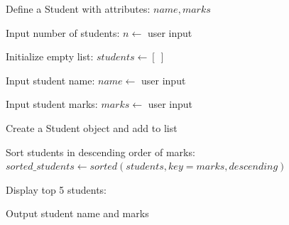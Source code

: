\begin{algorithm}
\caption{Display Top 5 Students Based on Marks}
\begin{algorithmic}[1]

\STATE Define a Student with attributes:
\STATE $name, marks$

\STATE Input number of students:
\STATE $n \gets$ user input

\STATE Initialize empty list:
\STATE $students \gets [\ ]$

    \STATE Input student name:
    \STATE $name \gets$ user input
    
    \STATE Input student marks:
    \STATE $marks \gets$ user input
    
    \STATE Create a Student object and add to list
\ENDFOR

\STATE Sort students in descending order of marks:
\STATE $sorted\_students \gets sorted(students, key = marks, descending)$

\STATE Display top 5 students:

    \STATE Output student name and marks
\ENDFOR

\end{algorithmic}
\end{algorithm}